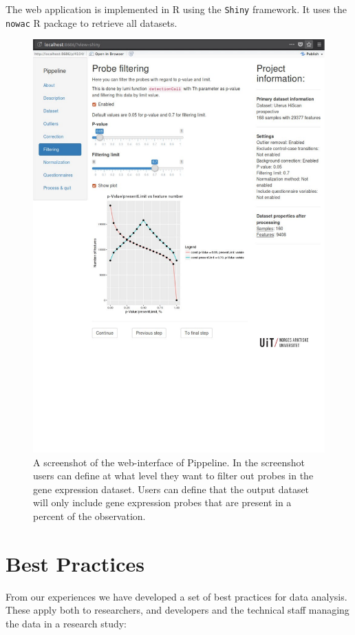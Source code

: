 The web application is implemented in R using the \texttt{Shiny} framework. It
uses the \texttt{nowac} R package to retrieve all datasets. 

\begin{figure}
    \includegraphics[width=\linewidth]{figures/scr_filtering.pdf}
    \caption[A screenshot of the web-interface of Pippeline.]{A screenshot of
    the web-interface of Pippeline. In the screenshot users can define at what
    level they want to filter out probes in the gene expression dataset. Users
    can define that the output dataset will only include gene expression probes
    that are present in a percent of the observation.}
  \label{fig:scr_filtering}
\end{figure}

\section{Best Practices} 
From our experiences we have developed a set of best practices for data
analysis. These apply both to researchers, and developers and the technical
staff managing the data in a research study: 

